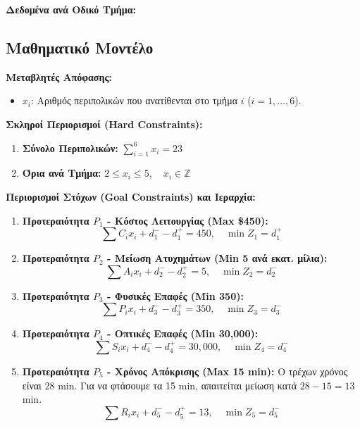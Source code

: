 \documentclass[12pt, a4paper]{article}
\begin{document}
\textbf{Δεδομένα ανά Οδικό Τμήμα:}
\begin{table}[h]
\centering
{}
\end{table}

\subsection*{Μαθηματικό Μοντέλο}

\textbf{Μεταβλητές Απόφασης:}
\begin{itemize}
    \item $x_i$: Αριθμός περιπολικών που ανατίθενται στο τμήμα $i$ ($i=1,\dots,6$).
\end{itemize}

\textbf{Σκληροί Περιορισμοί (Hard Constraints):}
\begin{enumerate}
    \item \textbf{Σύνολο Περιπολικών:} $\sum_{i=1}^{6} x_i = 23$
    \item \textbf{Όρια ανά Τμήμα:} $2 \le x_i \le 5, \quad x_i \in \mathbb{Z}$
\end{enumerate}

\textbf{Περιορισμοί Στόχων (Goal Constraints) και Ιεραρχία:}

\begin{enumerate}
    \item \textbf{Προτεραιότητα $P_1$ - Κόστος Λειτουργίας (Max \$450):}
    $$ \sum C_i x_i + d_1^- - d_1^+ = 450, \quad \min Z_1 = d_1^+ $$
    \item \textbf{Προτεραιότητα $P_2$ - Μείωση Ατυχημάτων (Min 5 ανά εκατ. μίλια):}
    $$ \sum A_i x_i + d_2^- - d_2^+ = 5, \quad \min Z_2 = d_2^- $$
    \item \textbf{Προτεραιότητα $P_3$ - Φυσικές Επαφές (Min 350):}
    $$ \sum P_i x_i + d_3^- - d_3^+ = 350, \quad \min Z_3 = d_3^- $$
    \item \textbf{Προτεραιότητα $P_4$ - Οπτικές Επαφές (Min 30,000):}
    $$ \sum S_i x_i + d_4^- - d_4^+ = 30,000, \quad \min Z_4 = d_4^- $$
    \item \textbf{Προτεραιότητα $P_5$ - Χρόνος Απόκρισης (Max 15 min):}
    Ο τρέχων χρόνος είναι 28 min. Για να φτάσουμε τα 15 min, απαιτείται μείωση κατά $28 - 15 = 13$ min.
    $$ \sum R_i x_i + d_5^- - d_5^+ = 13, \quad \min Z_5 = d_5^- $$
\end{enumerate}
\end{document}
